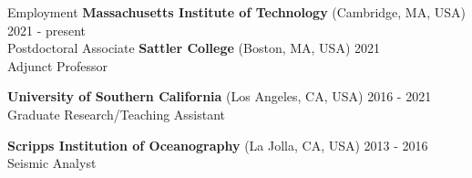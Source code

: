 \begin{rSection}{Employment}
	\textbf{Massachusetts Institute of Technology} (Cambridge, MA, USA) \hfill 2021 - present \\
	Postdoctoral Associate
	\smallbreak
	\textbf{Sattler College} (Boston, MA, USA) \hfill 2021 \\
	Adjunct Professor
	\smallbreak
	
	\textbf{University of Southern California} (Los Angeles, CA, USA) \hfill 2016 - 2021\\
	Graduate Research/Teaching Assistant
	\smallbreak
	
	\textbf{Scripps Institution of Oceanography} (La Jolla, CA, USA) \hfill 2013 - 2016\\
	Seismic Analyst
	\smallbreak
	

\end{rSection}
